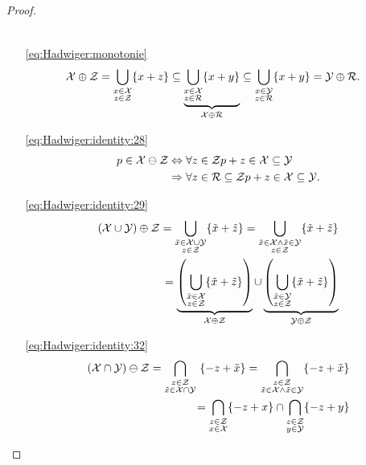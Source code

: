 \begin{proof}
\begin{itemize}
\begin{equation}
\begin{aligned}
\end{aligned}
\end{equation}
%
\item[\eqref{eq:Hadwiger:monotonie}]
%
\begin{equation}\begin{aligned}
	\mathcal X\oplus\mathcal Z &= \bigcup_{\substack{x\in\mathcal X\\ z\in\mathcal Z}}\{x+z\}\subseteq\underbrace{\bigcup_{\substack{x\in\mathcal X\\ z\in\mathcal R}}\{x+y\}}_{\mathcal X\oplus\mathcal R}
	\subseteq\bigcup_{\substack{x\in\mathcal Y\\ z\in\mathcal R}} \{x+y\} = \mathcal Y\oplus\mathcal R.
\end{aligned}\end{equation}
%
\item[\eqref{eq:Hadwiger:identity:28}]
%
\begin{equation}
\begin{aligned}	
	p \in\mathcal X\ominus\mathcal Z &\Leftrightarrow \forall z\in\mathcal Z p+z\in\mathcal X\subseteq\mathcal Y\\
	&\Rightarrow \forall z\in\mathcal R\subseteq\mathcal Z p+z\in\mathcal X\subseteq\mathcal Y.
\end{aligned}
\end{equation}
%
\item[\eqref{eq:Hadwiger:identity:29}]
%
\begin{equation}
	\begin{aligned}
	(\mathcal X\cup\mathcal Y)\oplus\mathcal Z = \bigcup_{\substack{\tilde x\in\mathcal X\cup\mathcal Y\\ z\in\mathcal Z}}\{\tilde x+\tilde z\}
	=\bigcup_{\substack{\tilde x\in\mathcal X\wedge \tilde x\in\mathcal Y\\ z\in\mathcal Z}}\{\tilde x+\tilde z\}\\ = \underbrace{\left(\bigcup_{\substack{\tilde x\in\mathcal X\\ z\in\mathcal Z}}\{\tilde x+\tilde z\}\right)}_{\mathcal X\oplus\mathcal Z}\cup\underbrace{\left(\bigcup_{\substack{\tilde x\in\mathcal Y\\ z\in\mathcal Z}}\{\tilde x+\tilde z\}\right)}_{\mathcal Y\oplus\mathcal Z}
	\end{aligned}
\end{equation}
%
\item[\eqref{eq:Hadwiger:identity:32}]
%
\begin{equation}
	\begin{aligned}
	(\X\cap\Y)\ominus\Z = \bigcap_{\substack{z\in\Z\\\tilde x\in\X\cap\Y}} \{-z+\tilde x\} = \bigcap_{\substack{z\in\Z\\ \tilde x\in\X\wedge\tilde x\in\Y}}\{-z+\tilde x\}\\ = \bigcap_{\substack{z\in\Z\\x\in\X}}\{-z+x\}\cap\bigcap_{\substack{z\in\Z\\y\in\Y}}\{-z+y\}

\end{aligned}
\end{equation}
\end{itemize}
\end{proof}
